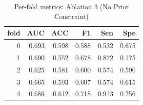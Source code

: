 \begin{table}[H]
\centering
\small
\caption{Per-fold metrics: Ablation 3 (No Prior Constraint)}
\label{tab:ablation3_no_penalty_per_fold}
\begin{tabular}{rrrrrr}
\toprule
fold & AUC & ACC & F1 & Sen & Spe \\
\midrule
0 & 0.693 & 0.598 & 0.588 & 0.532 & 0.675 \\
1 & 0.690 & 0.552 & 0.678 & 0.872 & 0.175 \\
2 & 0.625 & 0.581 & 0.600 & 0.574 & 0.590 \\
3 & 0.665 & 0.593 & 0.607 & 0.574 & 0.615 \\
4 & 0.686 & 0.612 & 0.718 & 0.913 & 0.256 \\
\bottomrule
\end{tabular}
\end{table}
